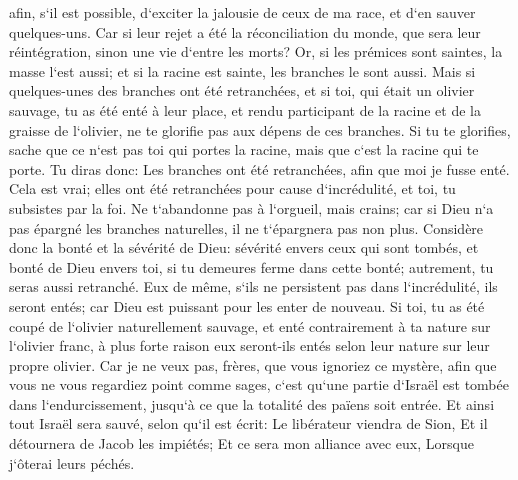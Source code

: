 \verse afin, s`il est possible, d`exciter la jalousie de ceux de ma race, et d`en sauver quelques-uns. 
\verse Car si leur rejet a été la réconciliation du monde, que sera leur réintégration, sinon une vie d`entre les morts? 
\verse Or, si les prémices sont saintes, la masse l`est aussi; et si la racine est sainte, les branches le sont aussi. 
\verse Mais si quelques-unes des branches ont été retranchées, et si toi, qui était un olivier sauvage, tu as été enté à leur place, et rendu participant de la racine et de la graisse de l`olivier, 
\verse ne te glorifie pas aux dépens de ces branches. Si tu te glorifies, sache que ce n`est pas toi qui portes la racine, mais que c`est la racine qui te porte. 
\verse Tu diras donc: Les branches ont été retranchées, afin que moi je fusse enté. 
\verse Cela est vrai; elles ont été retranchées pour cause d`incrédulité, et toi, tu subsistes par la foi. Ne t`abandonne pas à l`orgueil, mais crains; 
\verse car si Dieu n`a pas épargné les branches naturelles, il ne t`épargnera pas non plus. 
\verse Considère donc la bonté et la sévérité de Dieu: sévérité envers ceux qui sont tombés, et bonté de Dieu envers toi, si tu demeures ferme dans cette bonté; autrement, tu seras aussi retranché. 
\verse Eux de même, s`ils ne persistent pas dans l`incrédulité, ils seront entés; car Dieu est puissant pour les enter de nouveau. 
\verse Si toi, tu as été coupé de l`olivier naturellement sauvage, et enté contrairement à ta nature sur l`olivier franc, à plus forte raison eux seront-ils entés selon leur nature sur leur propre olivier. 
\verse Car je ne veux pas, frères, que vous ignoriez ce mystère, afin que vous ne vous regardiez point comme sages, c`est qu`une partie d`Israël est tombée dans l`endurcissement, jusqu`à ce que la totalité des païens soit entrée. 
\verse Et ainsi tout Israël sera sauvé, selon qu`il est écrit: Le libérateur viendra de Sion, Et il détournera de Jacob les impiétés; 
\verse Et ce sera mon alliance avec eux, Lorsque j`ôterai leurs péchés. 
